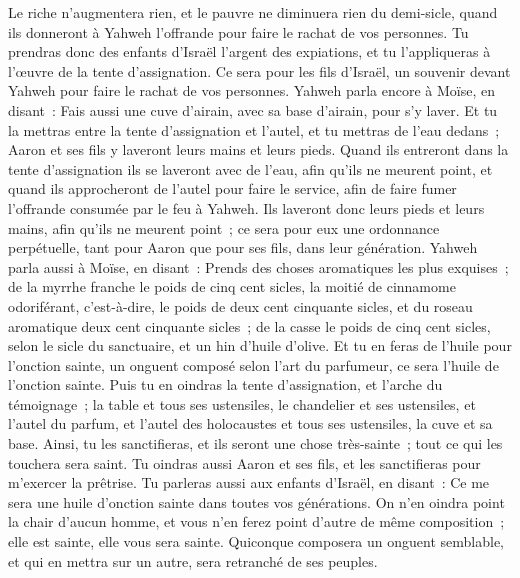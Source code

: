 \begin{multicols}{2}
Le riche n'augmentera rien, et le pauvre ne diminuera rien du demi-sicle, quand ils donneront à Yahweh l'offrande pour faire le rachat de vos personnes.
Tu prendras donc des enfants d'Israël l'argent des expiations, et tu l'appliqueras à l'œuvre de la tente d'assignation. Ce sera pour les fils d'Israël, un souvenir devant Yahweh pour faire le rachat de vos personnes.
Yahweh parla encore à Moïse, en disant~:
Fais aussi une cuve d'airain, avec sa base d'airain, pour s'y laver. Et tu la mettras entre la tente d'assignation et l'autel, et tu mettras de l'eau dedans~;
Aaron et ses fils y laveront leurs mains et leurs pieds.
Quand ils entreront dans la tente d'assignation ils se laveront avec de l'eau, afin qu'ils ne meurent point, et quand ils approcheront de l'autel pour faire le service, afin de faire fumer l'offrande consumée par le feu à Yahweh.
Ils laveront donc leurs pieds et leurs mains, afin qu'ils ne meurent point~; ce sera pour eux une ordonnance perpétuelle, tant pour Aaron que pour ses fils, dans leur génération.
Yahweh parla aussi à Moïse, en disant~:
Prends des choses aromatiques les plus exquises~; de la myrrhe franche le poids de cinq cent sicles, la moitié de cinnamome odoriférant, c'est-à-dire, le poids de deux cent cinquante sicles, et du roseau aromatique deux cent cinquante sicles~;
de la casse le poids de cinq cent sicles, selon le sicle du sanctuaire, et un hin d'huile d'olive.
Et tu en feras de l'huile pour l'onction sainte, un onguent composé selon l'art du parfumeur, ce sera l'huile de l'onction sainte.
Puis tu en oindras la tente d'assignation, et l'arche du témoignage~;
la table et tous ses ustensiles, le chandelier et ses ustensiles, et l'autel du parfum,
 et l'autel des holocaustes et tous ses ustensiles, la cuve et sa base.
Ainsi, tu les sanctifieras, et ils seront une chose très-sainte~; tout ce qui les touchera sera saint.
Tu oindras aussi Aaron et ses fils, et les sanctifieras pour m'exercer la prêtrise.
Tu parleras aussi aux enfants d'Israël, en disant~: Ce me sera une huile d'onction sainte dans toutes vos générations.
On n'en oindra point la chair d'aucun homme, et vous n'en ferez point d'autre de même composition~; elle est sainte, elle vous sera sainte.
Quiconque composera un onguent semblable, et qui en mettra sur un autre, sera retranché de ses peuples.

\end{multicols}
